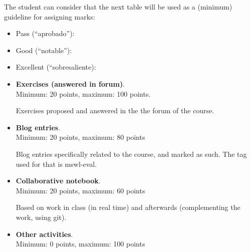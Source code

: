 \documentclass[a4paper]{article}
\begin{document}
The student can consider that the next table will be used as a (minimum) guideline for assigning marks:

\begin{itemize}
\item Pass (``aprobado''): 
\item Good (``notable''): 
\item Excellent (``sobresaliente): 
\end{itemize}

\begin{itemize}
\item \textbf{Exercises (answered in forum)}. \\
  Minimum: 20 points, maximum: 100 points.

  Exercises proposed and answered in the the forum of the course.

\item \textbf{Blog entries}. \\
  Minimum: 20 points, maximum: 80 points

  Blog entries specifically related to the course, and marked as such. The tag used for that is mswl-eval.

\item \textbf{Collaborative notebook}. \\
  Minimum: 20 points, maximum: 60 points

  Based on work in class (in real time) and afterwards (complementing the work, using git).


\item \textbf{Other activities}. \\
  Minimum: 0 points, maximum: 100 points

\end{itemize}
\end{document}
